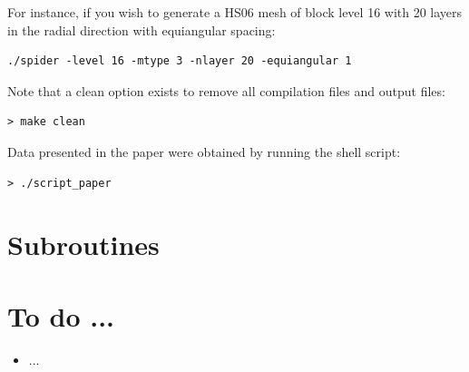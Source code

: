 \documentclass[a4paper]{article}
\begin{document}
For instance, if you wish to generate a HS06 mesh of block level 16
with 20 layers in the radial direction with equiangular spacing:
\begin{verbatim}
./spider -level 16 -mtype 3 -nlayer 20 -equiangular 1
\end{verbatim}

Note that a clean option exists to remove all compilation files and output files:
\begin{verbatim}
> make clean 
\end{verbatim}

Data presented in the paper were obtained by running the shell script:
\begin{verbatim}
> ./script_paper 
\end{verbatim}


\section{Subroutines}


\section{To do ...}

\begin{itemize}
\item ...
\end{itemize}
\end{document}
